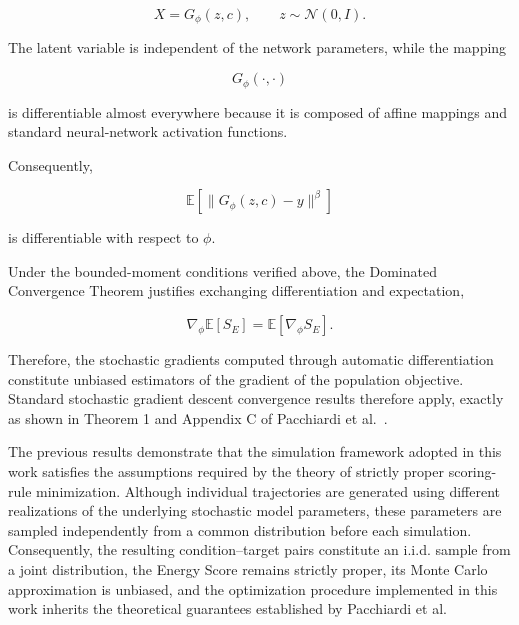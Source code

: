 \begin{appendices}
\[
X
=
G_\phi(z,c),
\qquad
z\sim\mathcal N(0,I).
\]

The latent variable is independent of the network parameters, while the mapping

\[
G_\phi(\cdot,\cdot)
\]

is differentiable almost everywhere because it is composed of affine mappings and standard neural-network activation functions.

Consequently,

\[
\mathbb E
\left[
\|G_\phi(z,c)-y\|^\beta
\right]
\]

is differentiable with respect to $\phi$.

Under the bounded-moment conditions verified above, the Dominated Convergence Theorem justifies exchanging differentiation and expectation,

\[
\nabla_\phi
\mathbb E
[S_E]
=
\mathbb E
[
\nabla_\phi S_E
].
\]

Therefore, the stochastic gradients computed through automatic differentiation constitute unbiased estimators of the gradient of the population objective. Standard stochastic gradient descent convergence results therefore apply, exactly as shown in Theorem 1 and Appendix C of Pacchiardi et al.~\cite{srforgan:srforgan}.


The previous results demonstrate that the simulation framework adopted in this work satisfies the assumptions required by the theory of strictly proper scoring-rule minimization. Although individual trajectories are generated using different realizations of the underlying stochastic model parameters, these parameters are sampled independently from a common distribution before each simulation. Consequently, the resulting condition--target pairs constitute an i.i.d. sample from a joint distribution, the Energy Score remains strictly proper, its Monte Carlo approximation is unbiased, and the optimization procedure implemented in this work inherits the theoretical guarantees established by Pacchiardi et al.

\end{appendices}